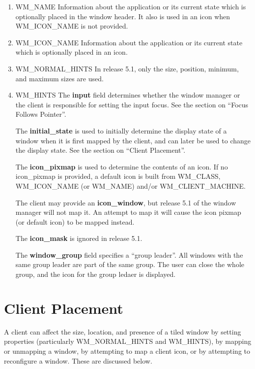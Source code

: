 \begin{enumerate}
\item 
{\sc WM\_NAME}\newline{}
Information about the application or its current state
which is optionally placed in the window header.  It also is used
in an icon when {\sc WM\_ICON\_NAME} is not provided.


\item 
{\sc WM\_ICON\_NAME}\newline{}
Information about the application or its current state
which is optionally placed in an icon.


\item 
{\sc WM\_NORMAL\_HINTS}\newline{}
In release 5.1, only the size, position, minimum, and maximum sizes are
used.


\item 
{\sc WM\_HINTS}\newline{}
The {\bf input} field determines whether the window manager or the client is
responsible for setting the input focus.  See the section on ``Focus
Follows Pointer''.

The {\bf initial\_state} is used to initially determine the display state of
a window when it is first mapped by
the client, and can later be used to change the display state.
See the
section on ``Client Placement''.

The {\bf icon\_pixmap} is used to determine the contents of an icon.
If no icon\_pixmap is provided, a default icon is built from {\sc WM\_CLASS},
{\sc WM\_ICON\_NAME} (or {\sc WM\_NAME}) and/or {\sc WM\_CLIENT\_MACHINE}.

The client may provide an {\bf icon\_window}, but release 5.1 of the
window manager will not map it.  An attempt to map it will cause the icon
pixmap (or default icon) to be mapped instead.

The {\bf icon\_mask} is ignored in release 5.1.

The {\bf window\_group} field specifies a ``group leader''.  All windows
with the same group leader are part of the same group.  The user can
close the whole group, and the icon for the group ledaer is displayed.


\end{enumerate}

\section{Client Placement}

A client can affect the size, location, and presence of a tiled window
by setting properties (particularly {\sc WM\_NORMAL\_HINTS} and
{\sc WM\_HINTS}), by mapping or
unmapping a window, by attempting to map a client icon, or by attempting
to reconfigure a window.  These are discussed below.

